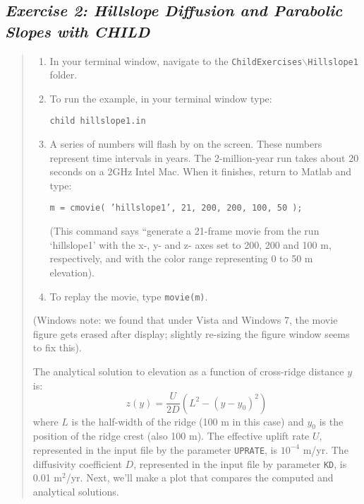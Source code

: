 \documentclass[12pt,reqno]{amsart}
\begin{document}
\subsection*{\em Exercise 2: Hillslope Diffusion and Parabolic Slopes with CHILD}
\begin{quote}
\small
{\sf
\begin{enumerate}
\item
In your terminal window, navigate to the {\tt ChildExercises$\backslash$Hillslope1} folder. 
\item
To run the example, in your terminal window type:

\noindent
{\tt child hillslope1.in}

\item
A series of numbers will flash by on the screen. These numbers represent time intervals in years. The 2-million-year run takes about 20 seconds on a 2GHz Intel Mac. When it finishes, return to Matlab and type: 

{\tt m = cmovie( 'hillslope1', 21, 200, 200, 100, 50 );}

\noindent (This command says ``generate a 21-frame movie from the run `hillslope1' with the x-, y- and z- axes set to 200, 200 and 100 m, respectively, and with the color range representing 0 to 50 m elevation).
\item
To replay the movie, type {\tt movie(m)}.

\end{enumerate}
(Windows note: we found that under Vista and Windows 7, the movie figure gets erased after display; slightly re-sizing the figure window seems to fix this).

The analytical solution to elevation as a function of cross-ridge distance $y$ is:
\begin{equation}
z(y) = \frac{U}{2D} \left( L^2 - (y-y_0)^2 \right)
\end{equation}
where $L$ is the half-width of the ridge (100 m in this case) and $y_0$ is the position of the ridge crest (also 100 m). The effective uplift rate $U$, represented in the input file by the parameter {\tt UPRATE}, is $10^{-4}$ m/yr. The diffusivity coefficient $D$, represented in the input file by parameter {\tt KD}, is 0.01 m$^2$/yr. Next, we'll make a plot that compares the computed and analytical solutions. 

}
\end{quote}
\end{document}
